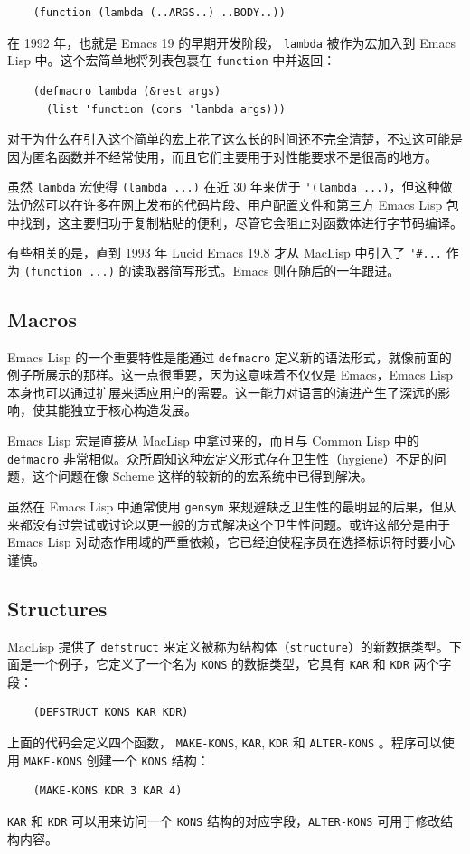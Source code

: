 \documentclass[format=acmsmall,screen]{acmart}
\begin{document}
%
\begin{verbatim}
    (function (lambda (..ARGS..) ..BODY..))
\end{verbatim}
%
在 1992 年，也就是 Emacs 19 的早期开发阶段， \texttt{lambda} 被作为宏加入到 Emacs Lisp 中。这个宏简单地将列表包裹在 \texttt{function} 中并返回：
\begin{verbatim}
    (defmacro lambda (&rest args)
      (list 'function (cons 'lambda args)))
\end{verbatim}

对于为什么在引入这个简单的宏上花了这么长的时间还不完全清楚，不过这可能是因为匿名函数并不经常使用，而且它们主要用于对性能要求不是很高的地方。

虽然 \texttt{lambda} 宏使得 \texttt{(lambda ...)} 在近 30 年来优于 \verb|'|\texttt{(lambda ...)}，但这种做法仍然可以在许多在网上发布的代码片段、用户配置文件和第三方 Emacs Lisp 包中找到，这主要归功于复制粘贴的便利，尽管它会阻止对函数体进行字节码编译。

有些相关的是，直到 1993 年 Lucid Emacs 19.8 才从 MacLisp 中引入了 \verb|'#...| 作为 \texttt{(function ...)} 的读取器简写形式。Emacs 则在随后的一年跟进。

\subsection{Macros}
\label{sec:macros}

Emacs Lisp 的一个重要特性是能通过 \texttt{defmacro} 定义新的语法形式，就像前面的例子所展示的那样。这一点很重要，因为这意味着不仅仅是 Emacs，Emacs Lisp 本身也可以通过扩展来适应用户的需要。这一能力对语言的演进产生了深远的影响，使其能独立于核心构造发展。

Emacs Lisp 宏是直接从 MacLisp 中拿过来的，而且与 Common Lisp 中的 \texttt{defmacro} 非常相似。众所周知这种宏定义形式存在卫生性（hygiene）不足的问题，这个问题在像 Scheme 这样的较新的的宏系统中已得到解决。

虽然在 Emacs Lisp 中通常使用 \texttt{gensym} 来规避缺乏卫生性的最明显的后果，但从来都没有过尝试或讨论以更一般的方式解决这个卫生性问题。或许这部分是由于 Emacs Lisp 对动态作用域的严重依赖，它已经迫使程序员在选择标识符时要小心谨慎。

\subsection{Structures}
\label{sec:structures}

MacLisp 提供了 \texttt{defstruct} 来定义被称为结构体（\texttt{structure}）的新数据类型。下面是一个例子，它定义了一个名为 \texttt{KONS} 的数据类型，它具有 \texttt{KAR} 和 \texttt{KDR} 两个字段：
%
\begin{verbatim}
    (DEFSTRUCT KONS KAR KDR)
\end{verbatim}
%
上面的代码会定义四个函数， \texttt{MAKE-KONS}, \texttt{KAR}, \texttt{KDR} 和 \texttt{ALTER-KONS} 。程序可以使用 \texttt{MAKE-KONS} 创建一个 \texttt{KONS} 结构：
%
\begin{verbatim}
    (MAKE-KONS KDR 3 KAR 4)
\end{verbatim}
%
\texttt{KAR} 和 \texttt{KDR} 可以用来访问一个 \texttt{KONS} 结构的对应字段，\texttt{ALTER-KONS} 可用于修改结构内容。
\end{document}
